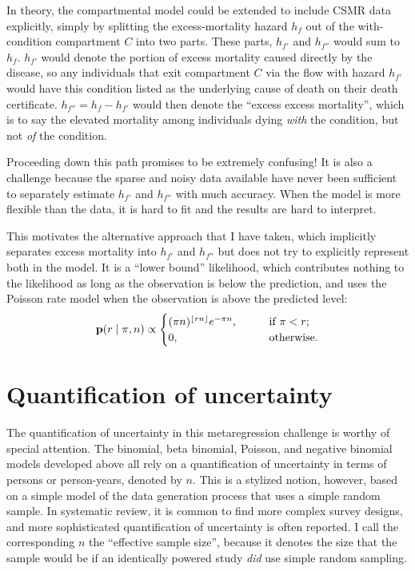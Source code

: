 In theory, the compartmental model could be extended to include CSMR
data explicitly, simply by splitting the excess-mortality hazard $h_f$ out
of the with-condition compartment $C$ into two parts.  These parts,
$h_{f'}$ and $h_{f''}$ would sum to $h_f$. $h_{f'}$ would denote the portion of
excess mortality caused directly by the disease, so any individuals
that exit compartment $C$ via the flow with hazard $h_{f'}$ would have this condition
listed as the underlying cause of death on their death certificate.
$h_{f''} = h_{f} - h_{f'}$ would then denote the ``excess excess mortality'',
which is to say the elevated mortality among individuals dying
\emph{with} the condition, but not \emph{of} the condition.

Proceeding down this path promises to be extremely confusing!  It is
also a challenge because the sparse and noisy data available have
never been sufficient to separately estimate $h_{f'}$ and $h_{f''}$ with much
accuracy.  When the model is more flexible than the data, it is hard
to fit and the results are hard to interpret.

This motivates the alternative approach that I have taken, which
implicitly separates excess mortality into $h_{f'}$ and $h_{f''}$ but does
not try to explicitly represent both in the model.  It is a ``lower
bound'' likelihood, which contributes nothing to the likelihood as
long as the observation is below the prediction, and uses the Poisson
rate model when the observation is above the predicted level:
\[
\mathbf{p}(r \;|\; \pi,n) \propto
\begin{cases}
(\pi n)^{\lfloor rn\rfloor} e^{-\pi n}, &\qquad\text{if } \pi < r;\\
  0, &\qquad\text{otherwise.}
\end{cases}
\]

\section{Quantification of uncertainty}
The quantification of uncertainty in this metaregression challenge is
worthy of special attention.  The binomial, beta binomial, Poisson,
and negative binomial models developed above all rely on a
quantification of uncertainty in terms of persons or person-years,
denoted by $n$.  This is a stylized notion, however, based on a simple
model of the data generation process that uses a simple random sample.
In systematic review, it is common to find more complex survey
designs, and more sophisticated quantification of uncertainty is often
reported.  I call the corresponding $n$ the ``effective sample size'',
because it denotes the size that the sample would be if an identically
powered study \emph{did} use simple random sampling.

